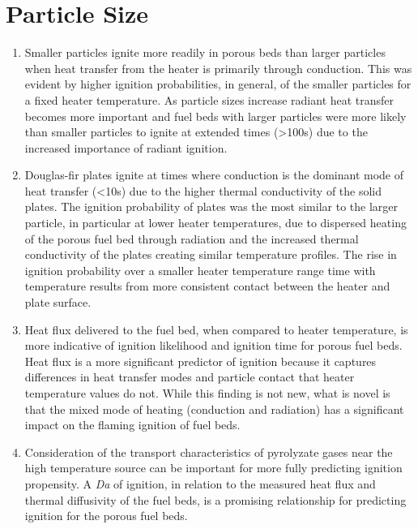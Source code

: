 \section{Particle Size}
        \begin{enumerate}
            \item 
                Smaller particles ignite more readily in porous beds than larger particles when heat transfer from the heater is primarily through conduction. This was evident by higher ignition probabilities, in general, of the smaller particles for a fixed heater temperature. As particle sizes increase radiant heat transfer becomes more important and fuel beds with larger particles were more likely than smaller particles to ignite at extended times (\textgreater 100\si{\second}) due to the increased importance of radiant ignition. 
            \item
                Douglas-fir plates ignite at times where conduction is the dominant mode of heat transfer (\textless 10\si{\second}) due to the higher thermal conductivity of the solid plates. The ignition probability of plates was the most similar to the larger particle, in particular at lower heater temperatures, due to dispersed heating of the porous fuel bed through radiation and the increased thermal conductivity of the plates creating similar temperature profiles. The rise in ignition probability  over a smaller heater temperature range time with temperature results from more consistent contact between the heater and plate surface.
            \item 
                Heat flux delivered to the fuel bed, when compared to heater temperature, is more indicative of ignition likelihood and ignition time for porous fuel beds. Heat flux is a more significant predictor of ignition because it captures differences in heat transfer modes and particle contact that heater temperature values do not. While this finding is not new, what is novel is that the mixed mode of heating (conduction and radiation) has a significant impact on the flaming ignition of fuel beds.
            \item 
                Consideration of the transport characteristics of pyrolyzate gases near the high temperature source can be important for more fully predicting ignition propensity. A \textit{Da} of ignition, in relation to the measured heat flux and thermal diffusivity of the fuel beds, is a promising relationship for predicting ignition for the porous fuel beds.  
        \end{enumerate}


